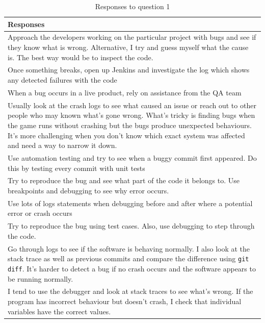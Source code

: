 \documentclass[../main.tex]{subfiles}
\begin{document}
\begin{table}[H]
\centering
    \begin{tabular}{|p{15cm}|}
        \hline
        \textbf{Responses}\\ 
        \hline\hline
        Approach the developers working on the particular project with bugs and see if they know what is wrong. Alternative, I try and guess myself what the cause is. The best way would be to inspect the code.\\
        \hline
        Once something breaks, open up Jenkins and investigate the log which shows any detected failures with the code\\
        \hline
        When a bug occurs in a live product, rely on assistance from the QA team\\
        \hline
        Usually look at the crash logs to see what caused an issue or reach out to other people who may known what's gone wrong. What's tricky is finding bugs when the game runs without crashing but the bugs produce unexpected behaviours. It's more challenging when you don't know which exact system was affected and need a way to narrow it down.\\
        \hline
        Use automation testing and try to see when a buggy commit first appeared. Do this by testing every commit with unit tests\\
        \hline
        Try to reproduce the bug and see what part of the code it belongs to. Use breakpoints and debugging to see why error occurs.\\
        \hline
        Use lots of logs statements when debugging before and after where a potential error or crash occurs\\
        \hline
        Try to reproduce the bug using test cases. Also, use debugging to step through the code.\\
        \hline
        Go through logs to see if the software is behaving normally. I also look at the stack trace as well as previous commits and compare the difference using \texttt{git diff}. It's harder to detect a bug if no crash occurs and the software appears to be running normally. \\
        \hline
        I tend to use the debugger and look at stack traces to see what's wrong. If the program has incorrect behaviour but doesn't crash, I check that individual variables have the correct values. \\
        \hline
    \end{tabular}
\caption{Responses to question 1}
\label{table:rq2Table1}
\end{table}
\end{document}
